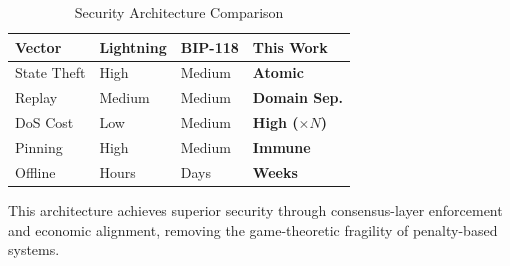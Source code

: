 \begin{table}[htbp]
\centering
\caption{Security Architecture Comparison}
\label{tab:sec_comparison}
\scriptsize
\begin{tabularx}{\linewidth}{@{}l l l X@{}}
\toprule
\textbf{Vector} & \textbf{Lightning} & \textbf{BIP-118} & \textbf{This Work} \\
\midrule
State Theft & High & Medium & \textbf{Atomic} \\
Replay & Medium & Medium & \textbf{Domain Sep.} \\
DoS Cost & Low & Medium & \textbf{High ($\times N$)} \\
Pinning & High & Medium & \textbf{Immune} \\
Offline & Hours & Days & \textbf{Weeks} \\
\bottomrule
\end{tabularx}
\end{table}

This architecture achieves superior security through consensus-layer enforcement and economic alignment, removing the game-theoretic fragility of penalty-based systems.
